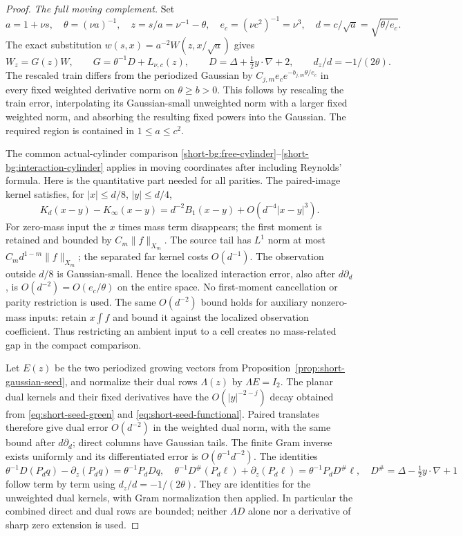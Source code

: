 \begin{proof}
\emph{The full moving complement.}
Set
\[
 a=1+\nu s,\quad \theta=(\nu a)^{-1},\quad
 z=s/a=\nu^{-1}-\theta,\quad e_c=(\nu c^2)^{-1}=\nu^3,
 \quad d=c/\sqrt a=\sqrt{\theta/e_c}.
\]
The exact substitution $w(s,x)=a^{-2}W(z,x/\sqrt a)$ gives
\begin{equation}\label{eq:short-causal-moving}
 W_z=G(z)W,\qquad G=\theta^{-1}D+L_{\nu,c}(z),\qquad
 D=\Delta+\tfrac12 y\cdot\nabla+2,\qquad
 d_z/d=-1/(2\theta).
\end{equation}
The rescaled train differs from the periodized Gaussian by
$C_{j,m}e_c e^{-b_{j,m}\theta/e_c}$ in every fixed weighted derivative
norm on $\theta\ge b>0$. This follows by rescaling the train error,
interpolating its Gaussian-small unweighted norm with a larger fixed
weighted norm, and absorbing the resulting fixed powers into the
Gaussian. The required region is contained in $1\le a\le c^2$.

The common actual-cylinder comparison
\eqref{short-bg:free-cylinder}--\eqref{short-bg:interaction-cylinder}
applies in moving coordinates after including Reynolds' formula.
Here is the quantitative part needed for all parities. The paired-image
kernel satisfies, for $|x|\le d/8$, $|y|\le d/4$,
\[
 K_d(x-y)-K_\infty(x-y)
 =d^{-2}B_1(x-y)+O(d^{-4}|x-y|^3).
\]
For zero-mass input the $x$ times mass term disappears; the first
moment is retained and bounded by $C_m\|f\|_{X_m}$. The source tail
has $L^1$ norm at most $C_md^{1-m}\|f\|_{X_m}$; the separated
far kernel costs $O(d^{-1})$. The observation outside $d/8$ is
Gaussian-small. Hence the localized interaction error, also after
$d\partial_d$, is $O(d^{-2})=O(e_c/\theta)$ on the entire space.
No first-moment cancellation or parity restriction is used. The same
$O(d^{-2})$ bound holds for auxiliary nonzero-mass inputs: retain
$x\int f$ and bound it against the localized observation coefficient.
Thus restricting an ambient input to a cell creates no mass-related
gap in the compact comparison.

Let $E(z)$ be the two periodized growing vectors from
Proposition~\ref{prop:short-gaussian-seed}, and normalize their dual
rows $\Lambda(z)$ by $\Lambda E=I_2$. The planar dual kernels and
their fixed derivatives have the $O(|y|^{-2-j})$ decay obtained from
\eqref{eq:short-seed-green} and \eqref{eq:short-seed-functional}.
Paired translates therefore give dual error $O(d^{-2})$ in the
weighted dual norm, with the same bound after $d\partial_d$; direct
columns have Gaussian tails. The finite Gram inverse exists uniformly
and its differentiated error is $O(\theta^{-1}d^{-2})$.
The identities
\[
 \theta^{-1}D(P_dq)-\partial_z(P_dq)=\theta^{-1}P_dDq,
 \quad
 \theta^{-1}D^\#(P_d\ell)+\partial_z(P_d\ell)
       =\theta^{-1}P_dD^\#\ell,
 \quad D^\#=\Delta-\tfrac12y\cdot\nabla+1
\]
follow term by term using $d_z/d=-1/(2\theta)$. They are identities
for the unweighted dual kernels, with Gram normalization then applied.
In particular the combined direct and dual rows are bounded; neither
$\Lambda D$ alone nor a derivative of sharp zero extension is used.


\end{proof}
